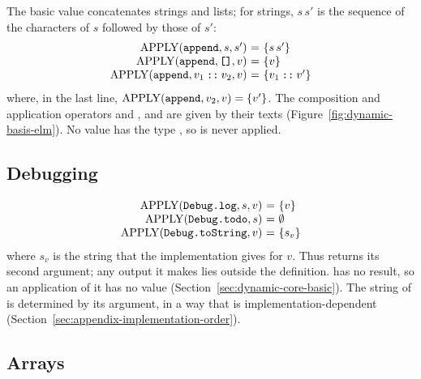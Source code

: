 The basic value  concatenates strings and lists; for strings,
$s\,s'$ is the sequence of the characters of $s$ followed by those of $s'$:
\[
  \begin{array}{@{}r@{\ }c@{\ }l@{}}
  \APPLY(\kw{append},s,s') & = & \{s\,s'\}\\
  \APPLY(\kw{append},\kw{[]},v) & = & \{v\}\\
  \APPLY(\kw{append},v_1\mathbin{\kw{::}}v_2,v) & = & \{v_1\mathbin{\kw{::}}v'\}
  \end{array}
\]
where, in the last line, $\mathrm{APPLY}(\textnormal{\texttt{append}},v_2,v)=\{v'\}$.
The composition and application operators and ,  and
 are given by their texts (Figure~\ref{fig:dynamic-basis-elm}). No
value has the type , so  is never applied.

\subsection{Debugging}\label{sec:appendix-dynamic-basis-debug}

\[
  \begin{array}{@{}r@{\ }c@{\ }l@{}}
  \APPLY(\kw{Debug.log},s,v) & = & \{v\}\\
  \APPLY(\kw{Debug.todo},s) & = & \emptyset\\
  \APPLY(\kw{Debug.toString},v) & = & \{s_v\}
  \end{array}
\]
where $s_v$ is the string that the implementation gives for $v$.
Thus  returns its second argument; any output it makes lies outside
the definition.  has no result, so an application of it has no
value (Section~\ref{sec:dynamic-core-basic}). The string of
 is determined by its argument, in a way that is
implementation-dependent (Section~\ref{sec:appendix-implementation-order}).

\subsection{Arrays}\label{sec:appendix-dynamic-basis-arrays}

